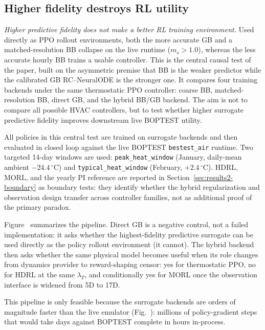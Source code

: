 \subsection{Higher fidelity destroys RL utility}
\label{sec:results2-control}



\emph{Higher predictive fidelity does not make a better RL training environment.} Used directly as PPO rollout environments, both the more accurate GB and a matched-resolution BB collapse on the live runtime ($m_s>1.0$), whereas the less accurate hourly BB trains a usable controller. This is the central causal test of the paper, built on the asymmetric premise that BB is the weaker predictor while the calibrated GB RC--NeuralODE is the stronger one. It compares four training backends under the same thermostatic PPO controller: coarse BB, matched-resolution BB, direct GB, and the hybrid BB/GB backend. The aim is not to compare all possible HVAC controllers, but to test whether higher surrogate predictive fidelity improves downstream live BOPTEST utility.

All policies in this central test are trained on surrogate backends and then evaluated in closed loop against the live BOPTEST \texttt{bestest\_air} runtime. Two targeted 14-day windows are used: \texttt{peak\_heat\_window} (January, daily-mean ambient $-24.4\,^\circ$C) and \texttt{typical\_heat\_window} (February, $+2.4\,^\circ$C). HDRL, MORL, and the yearly PI reference are reported in Section~\ref{sec:results2-boundary} as boundary tests: they identify whether the hybrid regularization and observation design transfer across controller families, not as additional proof of the primary paradox.

Figure~ summarizes the pipeline. Direct GB is a negative control, not a failed implementation: it asks whether the highest-fidelity predictive surrogate can be used directly as the policy rollout environment (it cannot). The hybrid backend then asks whether the same physical model becomes useful when its role changes from dynamics provider to reward-shaping censor: yes for thermostatic PPO, no for HDRL at the same $\lambda_T$, and conditionally yes for MORL once the observation interface is widened from 5D to 17D.






This pipeline is only feasible because the surrogate backends are orders of magnitude faster than the live emulator (Fig.~): millions of policy-gradient steps that would take days against BOPTEST complete in hours in-process.





